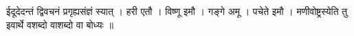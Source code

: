 ईदूदेदन्तं द्विवचनं प्रगृह्यसंज्ञं स्यात् । हरी एतौ । विष्णू इमौ । गङ्गे
अमू । पचेते इमौ । मणीवोष्ट्रस्येति तु इवार्थे वशब्दो वाशब्दो वा बोध्यः ॥
